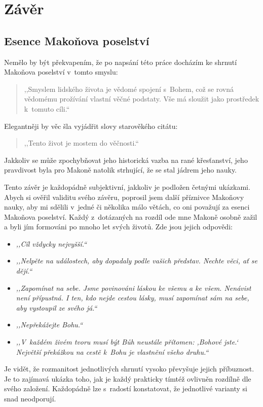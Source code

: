 \chapter{Závěr}

\section{Esence Makoňova poselství}

Nemělo by být překvapením, že po napsání této práce docházím ke shrnutí Makoňova
poselství v~tomto smyslu:
\begin{quote}
,,Smyslem lidského života je vědomé spojení s~Bohem,
což se rovná vědomému prožívání vlastní věčné podstaty. Vše má sloužit jako
prostředek k~tomuto cíli.``
\end{quote}
Elegantněji by věc šla vyjádřit slovy starověkého citátu:
\begin{quote}
,,Tento život je mostem do věčnosti.``
\end{quote}
Jakkoliv se může zpochybňovat jeho historická vazba na rané
křesťanství\cite{dus2001neznama}, jeho pravdivost byla pro Makoně natolik
strhující, že se stal jádrem jeho nauky.

Tento závěr je každopádně subjektivní, jakkoliv je podložen četnými ukázkami.
Abych si ověřil validitu svého závěru, poprosil jsem další příznivce Makoňovy
nauky, aby mi sdělili v~jedné či několika málo větách, co oni považují za esenci
Makoňova poselství. Každý z~dotázaných na rozdíl ode mne Makoně osobně zažil a
byli jím formováni po mnoho let svých životů. Zde jsou jejich odpovědi:

\begin{itemize}
  \item{\textit{,,Cíl vždycky nejvyšší.``}}
  \item{\textit{,,Nelpěte na událostech, aby dopadaly podle vašich představ. Nechte věci, ať
    se dějí.``}}
\item{\textit{,,Zapomínat na sebe. Jsme povinováni láskou ke všemu a ke všem. Nenávist
  není přípustná. I ten, kdo nejde cestou lásky, musí zapomínat sám na sebe, aby
    vystoupil ze svého já.``}}
  \item{\textit{,,Nepřekážejte Bohu.``}}
  \item{\textit{,,V~každém živém tvoru musí být Bůh neustále přítomen: ,Bohové jste.`
    Největší překážkou na cestě k~Bohu je vlastnění všeho druhu.``}}
\end{itemize}

Je vidět, že rozmanitost jednotlivých shrnutí vysoko převyšuje jejich
příbuznost. Je to zajímavá ukázka toho, jak je každý prakticky tímtéž ovlivněn
rozdílně dle svého založení. Každopádně lze s~radostí konstatovat, že jednotlivé
varianty si snad neodporují.


